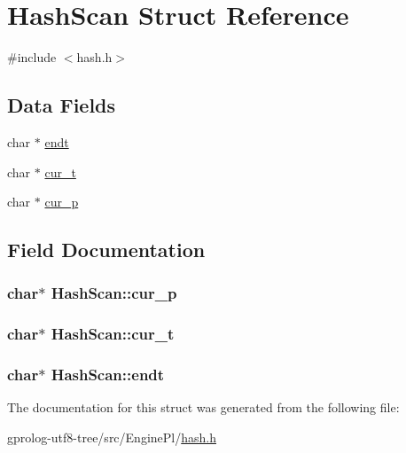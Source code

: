 \hypertarget{structHashScan}{}\section{Hash\+Scan Struct Reference}
\label{structHashScan}


{\ttfamily \#include $<$hash.\+h$>$}

\subsection*{Data Fields}
\begin{DoxyCompactItemize}
\item 
char $\ast$ \hyperlink{structHashScan_a40b9e0ec1b11cffe3e7bc2c20b7b8a4b}{endt}
\item 
char $\ast$ \hyperlink{structHashScan_af1c9388da5931a00722e2e9ea2c10f42}{cur\+\_\+t}
\item 
char $\ast$ \hyperlink{structHashScan_a267d5612893c8faa728cb27e1edd21aa}{cur\+\_\+p}
\end{DoxyCompactItemize}


\subsection{Field Documentation}
\subsubsection[{\texorpdfstring{cur\+\_\+p}{cur_p}}]{\setlength{\rightskip}{0pt plus 5cm}char$\ast$ Hash\+Scan\+::cur\+\_\+p}\hypertarget{structHashScan_a267d5612893c8faa728cb27e1edd21aa}{}\label{structHashScan_a267d5612893c8faa728cb27e1edd21aa}
\subsubsection[{\texorpdfstring{cur\+\_\+t}{cur_t}}]{\setlength{\rightskip}{0pt plus 5cm}char$\ast$ Hash\+Scan\+::cur\+\_\+t}\hypertarget{structHashScan_af1c9388da5931a00722e2e9ea2c10f42}{}\label{structHashScan_af1c9388da5931a00722e2e9ea2c10f42}
\subsubsection[{\texorpdfstring{endt}{endt}}]{\setlength{\rightskip}{0pt plus 5cm}char$\ast$ Hash\+Scan\+::endt}\hypertarget{structHashScan_a40b9e0ec1b11cffe3e7bc2c20b7b8a4b}{}\label{structHashScan_a40b9e0ec1b11cffe3e7bc2c20b7b8a4b}


The documentation for this struct was generated from the following file\+:\begin{DoxyCompactItemize}
\item 
gprolog-\/utf8-\/tree/src/\+Engine\+Pl/\hyperlink{hash_8h}{hash.\+h}\end{DoxyCompactItemize}
